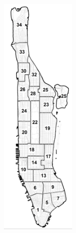 \documentclass[12pt]{beamer}
\begin{document}
\begin{frame}[t]
\begin{columns}
\begin{figure}[t!]
\begin{center}
\includegraphics[width=0.45\textwidth]{imgs/precincts.png}
\end{center}
\end{figure}

\end{columns}

\end{frame}

\end{document}
